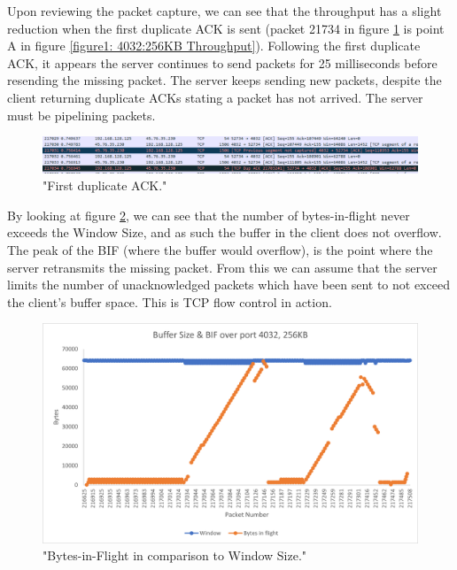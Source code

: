 \documentclass[12pt]{article}
\begin{document}
Upon reviewing the packet capture, we can see that the throughput has a slight reduction when the first duplicate ACK is sent (packet 21734 in figure \ref{figure2: first duplicate ACK} is point A in figure \ref{figure1: 4032:256KB Throughput}).
Following the first duplicate ACK, it appears the server continues to send packets for 25 milliseconds before resending the missing packet.
The server keeps sending new packets, despite the client returning duplicate ACKs stating a packet has not arrived.
The server must be pipelining packets.

\begin{figure}[!htbp]
  \centering
  \includegraphics[width=\linewidth]{4032-256KB-duplicate-ack.PNG}
  \caption{"First duplicate ACK."}
  \label{figure2: first duplicate ACK}
\end{figure}

By looking at figure \ref{figure3: BIF and Window Size}, we can see that the number of bytes-in-flight never exceeds the Window Size, and as such the buffer in the client does not overflow.
The peak of the BIF (where the buffer would overflow), is the point where the server retransmits the missing packet.
From this we can assume that the server limits the number of unacknowledged packets which have been sent to not exceed the client's buffer space.
This is TCP flow control in action.

\begin{figure}[!htbp]
  \centering
  \includegraphics[width=\linewidth]{4032-256KB-bytes-in-flight.png}
  \caption{"Bytes-in-Flight in comparison to Window Size."}
  \label{figure3: BIF and Window Size}
\end{figure}
\end{document}
